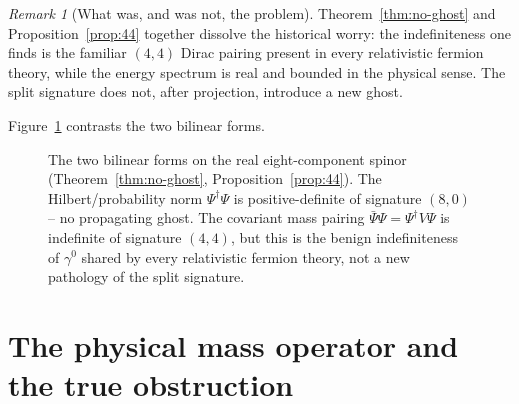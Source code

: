 \documentclass[11pt,oneside]{book}
\theoremstyle{plain}
\theoremstyle{definition}
\theoremstyle{remark}
\newtheorem{remark}[theorem]{Remark}
\begin{document}
\begin{remark}[What was, and was not, the problem]
Theorem~\ref{thm:no-ghost} and Proposition~\ref{prop:44} together dissolve the
historical worry: the indefiniteness one finds is the familiar $(4,4)$ Dirac
pairing present in every relativistic fermion theory, while the energy spectrum is
real and bounded in the physical sense. The split signature does not, after
projection, introduce a new ghost.
\end{remark}

Figure~\ref{fig:norms} contrasts the two bilinear forms.

\begin{figure}[tbp]
\centering
{}
\caption{The two bilinear forms on the real eight-component spinor
(Theorem~\ref{thm:no-ghost}, Proposition~\ref{prop:44}). The Hilbert/probability
norm $\Psi^\dagger\Psi$ is positive-definite of signature $(8,0)$ -- no propagating
ghost. The covariant mass pairing $\bar\Psi\Psi=\Psi^\dagger V\Psi$ is indefinite of
signature $(4,4)$, but this is the benign indefiniteness of $\gamma^0$ shared by
every relativistic fermion theory, not a new pathology of the split signature.}
\label{fig:norms}
\end{figure}

\section{The physical mass operator and the true obstruction}
\label{sec:true-obstruction}
\end{document}
